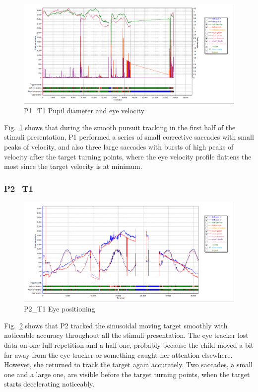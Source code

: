 \begin{figure}[h]
  \centering
  \includegraphics[width=.8\textwidth]{figures/graphs/P1_T1(sinusoid)_VP.png}
  \caption[P1\_T1 pupil velocity]{P1\_T1 Pupil diameter and eye velocity}
  \label{fig:P1_T1_vel}
\end{figure}

Fig.~\ref{fig:P1_T1_vel} shows that during the smooth pursuit tracking in the first half of the stimuli presentation, P1 performed a series of small corrective saccades with small peaks of velocity, and also three large saccades with bursts of high peaks of velocity after the target turning points, where the eye velocity profile flattens the most since the target velocity is at minimum.


\subsubsection{P2\_T1}
\label{sec:P2_T1}

\begin{figure}[h]
  \centering
  \includegraphics[width=.8\textwidth]{figures/graphs/P2_T1(sinusoid)_XY.png}
  \caption[P2\_T1 Eye positioning]{P2\_T1 Eye positioning}
  \label{fig:P2_T1_pos}
\end{figure}

Fig.~\ref{fig:P2_T1_pos} shows that P2 tracked the sinusoidal moving target smoothly with noticeable accuracy throughout all the stimuli presentation. The eye tracker lost data on one full repetition and a half one, probably because the child moved a bit far away from the eye tracker or something caught her attention elsewhere. However, she returned to track the target again accurately. Two saccades, a small one and a large one, are visible before the target turning points, when the target starts decelerating noticeably.

